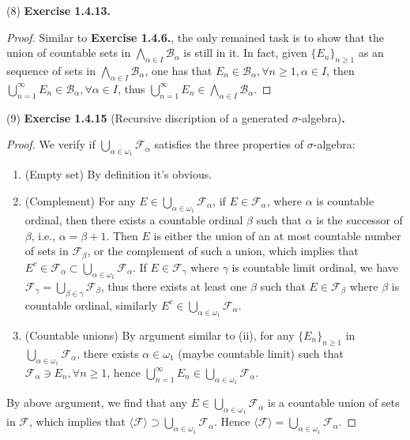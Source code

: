 \documentclass[a4paper]{article}
\begin{document}
(8) {\bfseries Exercise 1.4.13.}\begin{proof}
Similar to {\bfseries Exercise 1.4.6.}, the only remained task is to show that the union of countable sets in 
$\bigwedge_{\alpha \in I} \mathcal{B}_\alpha$ is still in it. In fact, given $\{E_n\}_{n \geq 1}$ as an sequence of sets in 
$\bigwedge_{\alpha \in I} \mathcal{B}_\alpha$, one has that $E_n \in \mathcal{B}_\alpha, \forall n \geq 1, \alpha \in I$,
then $\bigcup_{n = 1}^\infty E_n \in \mathcal{B}_\alpha, \forall \alpha \in I$, thus $\bigcup_{n = 1}^\infty E_n 
\in \bigwedge_{\alpha \in I} \mathcal{B}_\alpha$.
\end{proof}

(9) {\bfseries Exercise 1.4.15} (Recursive discription of a generated $\sigma$-algebra){\bfseries .}\begin{proof}
We verify if $\bigcup_{\alpha \in \omega_1} \mathcal{F}_\alpha$ satisfies the three properties of $\sigma$-algebra:
\begin{enumerate}[label = (\roman*)]
    \item (Empty set) By definition it's obvious.
    \item (Complement) For any $E \in \bigcup_{\alpha \in \omega_1} \mathcal{F}_\alpha$, if $E \in \mathcal{F}_\alpha$,
    where $\alpha$ is countable ordinal, then there exists a countable ordinal $\beta$ such that $\alpha$ is the successor
    of $\beta$, i.e., $\alpha = \beta + 1$. Then $E$ is either the union of an at most countable number of sets in
    $\mathcal{F}_\beta$, or the complement of such a union, which implies that 
    $E^c \in \mathcal{F}_\alpha \subset \bigcup_{\alpha \in \omega_1} \mathcal{F}_\alpha$.
    If $E \in \mathcal{F}_\gamma$ where $\gamma$ is countable limit ordinal, we have $\mathcal{F}_\gamma = \bigcup_{\beta \in \gamma}\mathcal{F}_\beta$,
    thus there exists at least one $\beta$ such that $E \in \mathcal{F}_\beta$ where $\beta$ is countable ordinal,
    similarly $E^c \in \bigcup_{\alpha \in \omega_1} \mathcal{F}_\alpha$.
    \item (Countable unions) By argument similar to (ii), for any $\{E_n\}_{n \geq 1}$ in $\bigcup_{\alpha \in \omega_1} \mathcal{F}_\alpha$,
    there exists $\alpha \in \omega_1$ (maybe countable limit) such that $\mathcal{F}_\alpha \ni E_n, \forall n \geq 1$,
    hence $\bigcup_{n = 1}^\infty E_n \in \bigcup_{\alpha \in \omega_1} \mathcal{F}_\alpha$.
\end{enumerate}
By above argument, we find that any $E \in \bigcup_{\alpha \in \omega_1} \mathcal{F}_\alpha$ is a countable union 
of sets in $\mathcal{F}$, which implies that $\langle \mathcal{F} \rangle \supset \bigcup_{\alpha \in \omega_1} \mathcal{F}_\alpha$.
Hence $\langle \mathcal{F} \rangle = \bigcup_{\alpha \in \omega_1} \mathcal{F}_\alpha$.
\end{proof}
\end{document}
